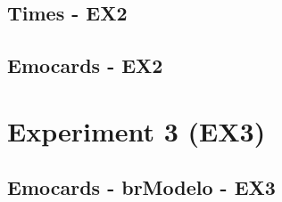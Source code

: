 \begin{apendicesenv}
\begin{figure}[!htb]
    \centering
    
    \label{fig:ex2FScore}
\end{figure}

\newpage

\section{Times - EX2}

\begin{figure}[!htb]
    \centering
    
    \label{fig:ex2Times}
\end{figure}

\newpage

\section{Emocards - EX2}

\begin{figure}[!htb]
    \centering
    
    \label{fig:ex2Emocards}
\end{figure}



\chapter{Experiment 3 (EX3)}

\section{Emocards - brModelo - EX3}

\begin{figure}[!htb]
    \centering
    
    \label{fig:ex3EmocardsbrModelo}
\end{figure}


\end{apendicesenv}
